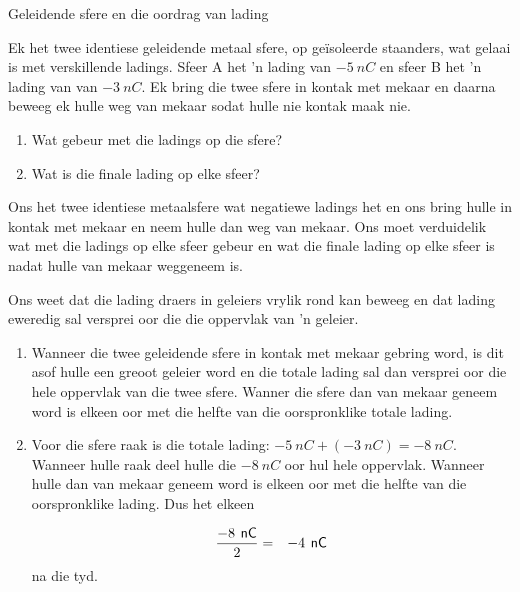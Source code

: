\begin{wex}{Geleidende sfere en die oordrag van lading}
{
Ek het twee identiese geleidende metaal sfere, op ge\"isoleerde staanders, wat gelaai is met verskillende ladings. Sfeer A het 'n lading van $-5~nC$ en sfeer B het 'n lading van van $-3~nC$. Ek bring die twee sfere in kontak met mekaar en daarna beweeg ek hulle weg van mekaar sodat hulle nie kontak maak nie.
\begin{enumerate}[itemsep=5pt, label=\textbf{\arabic*}.] 
    \item Wat gebeur met die ladings op die sfere?
    \item Wat is die finale lading op elke sfeer?
\end{enumerate}
}
{


Ons het twee identiese metaalsfere wat negatiewe ladings het en ons bring hulle in kontak met mekaar en neem hulle dan weg van mekaar. Ons moet verduidelik wat met die ladings op elke sfeer gebeur en wat die finale lading op elke sfeer is nadat hulle van mekaar weggeneem is.
      

Ons weet dat die lading draers in geleiers vrylik rond kan beweeg en dat lading eweredig sal versprei oor die die oppervlak van 'n geleier. \par
      

\begin{enumerate}[noitemsep, label=\textbf{\alph*}. ] 
    \item  Wanneer die twee geleidende sfere in kontak met mekaar gebring word, is dit asof hulle een greoot geleier word en die totale lading sal dan versprei oor die hele oppervlak van die twee sfere. Wanner die sfere dan van mekaar geneem word is elkeen oor met die helfte van die oorspronklike totale lading.

    \item Voor die sfere raak is die totale lading: $-5~nC + (-3~nC) = -8~nC$. Wanneer hulle raak deel hulle die $-8~nC$ oor hul hele oppervlak. Wanneer hulle dan van mekaar geneem word is elkeen oor met die helfte van die oorspronklike lading. Dus het elkeen
    
\begin{eqnarray*}
    \frac{-8\phantom{\rule{4pt}{0ex}}\mathsf{nC}}{2}& =& -4\phantom{\rule{4pt}{0ex}}\mathsf{nC}
      \end{eqnarray*}
na die tyd.
\end{enumerate}}
\end{wex}

